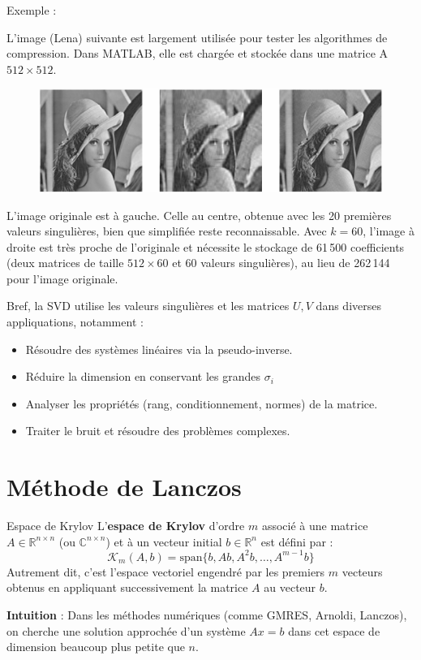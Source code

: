 \documentclass[french, 10pt]{beamer}
\theoremstyle{definition}
\begin{document}
\begin{frame}{Exemple :}
	
	L'image (Lena) suivante est largement utilisée pour tester les algorithmes de compression. Dans MATLAB, elle est chargée et stockée dans une matrice A $512 \times 512$.
	\begin{figure}[H]
		\includegraphics[scale=0.3]{pictures/lena.png}
	\end{figure}
	L’image originale est à gauche. Celle au centre, obtenue avec les 20 premières
	valeurs singulières, bien que simplifiée reste reconnaissable. Avec \( k = 60 \), l'image à droite est très proche de l'originale et nécessite le stockage de 61\,500 coefficients (deux matrices de taille \( 512 \times 60 \) et 60 valeurs singulières), au lieu de 262\,144 pour l'image originale.
\end{frame}
\begin{frame}
	Bref, la SVD utilise les valeurs singulières et les matrices 
	$U, V$ dans diverses appliquations, notamment :
	
	\begin{itemize}[label= $\diamond$]
		\item Résoudre des systèmes linéaires via la pseudo-inverse.
		\item Réduire la dimension en conservant les grandes $\sigma_i$
		\item Analyser les propriétés (rang, conditionnement, normes) de la matrice.
		\item Traiter le bruit et résoudre des problèmes complexes.
	\end{itemize}
\end{frame}

\section{Méthode de Lanczos}
\begin{frame}{Espace de Krylov \cite{golub2013} \cite{demmel1997} \cite{stoer2002} \cite{trefethen1997}}
	L’\textbf{espace de Krylov} d'ordre \(m\) associé à une matrice \(A \in \mathbb{R}^{n \times n}\) (ou \(\mathbb{C}^{n \times n}\)) et à un vecteur initial \(b \in \mathbb{R}^n\) est défini par :
	\[
	\mathcal{K}_m(A, b) = \text{span}\{b, Ab, A^2b, \dots, A^{m-1}b\}
	\]
	Autrement dit, c'est l'espace vectoriel engendré par les premiers \(m\) vecteurs obtenus en appliquant successivement la matrice \(A\) au vecteur \(b\).
	
	\textbf{Intuition} :  
	Dans les méthodes numériques (comme GMRES, Arnoldi, Lanczos), on cherche une solution approchée d’un système \(Ax = b\) dans cet espace de dimension beaucoup plus petite que \(n\).
\end{frame}
\end{document}
